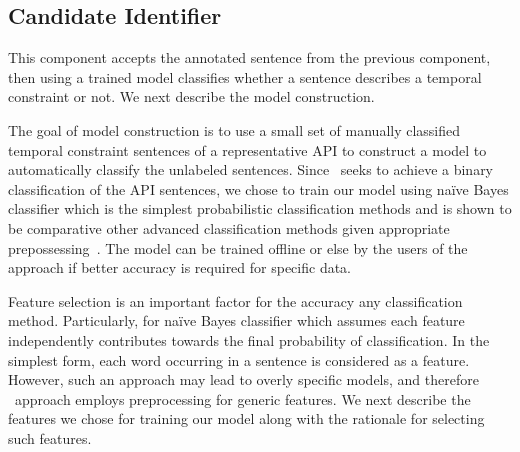 \subsection{Candidate Identifier}

This component accepts the annotated sentence from the previous component,
then using a trained model classifies whether a sentence describes a temporal constraint or not. We next describe the model construction.

The goal of model construction is to use a small set of manually classified temporal constraint sentences of a representative API to construct a model to automatically classify the unlabeled sentences. Since \tool\ seeks to achieve a binary classification of the API sentences, we chose to train our model using na{\"i}ve Bayes classifier which is the simplest probabilistic classification methods  and is shown to be comparative other advanced classification methods given appropriate prepossessing~\cite{rennie2003tackling}. The model can be trained offline or else by the users of the approach if better accuracy is required for specific data.

Feature selection is an important factor for the accuracy any classification method. Particularly, for na{\"i}ve Bayes classifier which assumes each feature independently contributes towards the final probability of classification. In the simplest form, each word occurring in a sentence is considered as a feature. However, such an approach may lead to overly specific models, and therefore \tool\ approach employs preprocessing for generic features. We next describe the features we chose for training our model along with the rationale for selecting such features.

